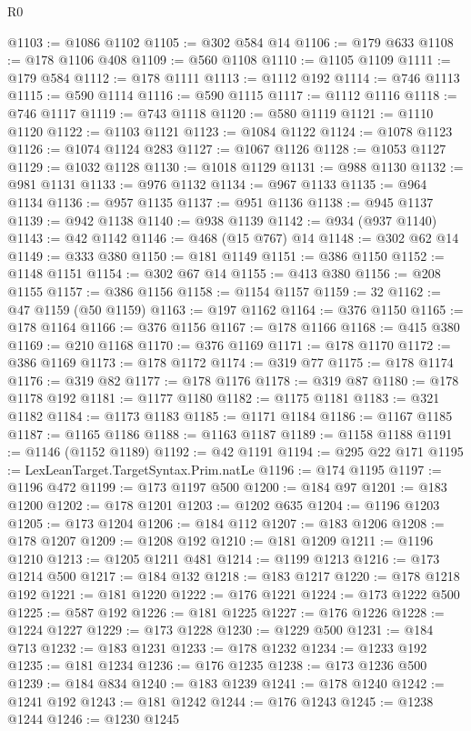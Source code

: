\begin{lexlean}{R0}
\begin{coremodule}
@1103 := @1086 @1102
@1105 := @302 @584 @14
@1106 := @179 @633
@1108 := @178 @1106 @408
@1109 := @560 @1108
@1110 := @1105 @1109
@1111 := @179 @584
@1112 := @178 @1111
@1113 := @1112 @192
@1114 := @746 @1113
@1115 := @590 @1114
@1116 := @590 @1115
@1117 := @1112 @1116
@1118 := @746 @1117
@1119 := @743 @1118
@1120 := @580 @1119
@1121 := @1110 @1120
@1122 := @1103 @1121
@1123 := @1084 @1122
@1124 := @1078 @1123
@1126 := @1074 @1124 @283
@1127 := @1067 @1126
@1128 := @1053 @1127
@1129 := @1032 @1128
@1130 := @1018 @1129
@1131 := @988 @1130
@1132 := @981 @1131
@1133 := @976 @1132
@1134 := @967 @1133
@1135 := @964 @1134
@1136 := @957 @1135
@1137 := @951 @1136
@1138 := @945 @1137
@1139 := @942 @1138
@1140 := @938 @1139
@1142 := @934 (@937 @1140)
@1143 := @42 @1142
@1146 := @468 (@15 @767) @14
@1148 := @302 @62 @14
@1149 := @333 @380
@1150 := @181 @1149
@1151 := @386 @1150
@1152 := @1148 @1151
@1154 := @302 @67 @14
@1155 := @413 @380
@1156 := @208 @1155
@1157 := @386 @1156
@1158 := @1154 @1157
@1159 := 32
@1162 := @47 @1159 (@50 @1159)
@1163 := @197 @1162
@1164 := @376 @1150
@1165 := @178 @1164
@1166 := @376 @1156
@1167 := @178 @1166
@1168 := @415 @380
@1169 := @210 @1168
@1170 := @376 @1169
@1171 := @178 @1170
@1172 := @386 @1169
@1173 := @178 @1172
@1174 := @319 @77
@1175 := @178 @1174
@1176 := @319 @82
@1177 := @178 @1176
@1178 := @319 @87
@1180 := @178 @1178 @192
@1181 := @1177 @1180
@1182 := @1175 @1181
@1183 := @321 @1182
@1184 := @1173 @1183
@1185 := @1171 @1184
@1186 := @1167 @1185
@1187 := @1165 @1186
@1188 := @1163 @1187
@1189 := @1158 @1188
@1191 := @1146 (@1152 @1189)
@1192 := @42 @1191
@1194 := @295 @22 @171
@1195 := LexLeanTarget.TargetSyntax.Prim.natLe
@1196 := @174 @1195
@1197 := @1196 @472
@1199 := @173 @1197 @500
@1200 := @184 @97
@1201 := @183 @1200
@1202 := @178 @1201
@1203 := @1202 @635
@1204 := @1196 @1203
@1205 := @173 @1204
@1206 := @184 @112
@1207 := @183 @1206
@1208 := @178 @1207
@1209 := @1208 @192
@1210 := @181 @1209
@1211 := @1196 @1210
@1213 := @1205 @1211 @481
@1214 := @1199 @1213
@1216 := @173 @1214 @500
@1217 := @184 @132
@1218 := @183 @1217
@1220 := @178 @1218 @192
@1221 := @181 @1220
@1222 := @176 @1221
@1224 := @173 @1222 @500
@1225 := @587 @192
@1226 := @181 @1225
@1227 := @176 @1226
@1228 := @1224 @1227
@1229 := @173 @1228
@1230 := @1229 @500
@1231 := @184 @713
@1232 := @183 @1231
@1233 := @178 @1232
@1234 := @1233 @192
@1235 := @181 @1234
@1236 := @176 @1235
@1238 := @173 @1236 @500
@1239 := @184 @834
@1240 := @183 @1239
@1241 := @178 @1240
@1242 := @1241 @192
@1243 := @181 @1242
@1244 := @176 @1243
@1245 := @1238 @1244
@1246 := @1230 @1245

\end{coremodule}
\end{lexlean}
